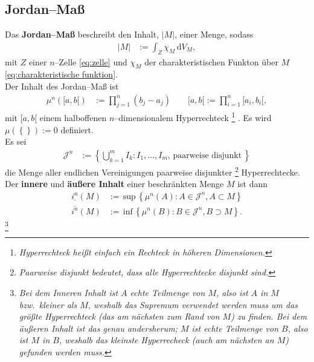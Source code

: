 \documentclass[a4paper,12pt]{article}
\newcommand{\td}{\,\text{d}}
\numberwithin{equation}{section}
\begin{document}
\subsection{Jordan--Maß}
Das \textbf{Jordan--Maß} beschreibt den Inhalt, $|M|$, einer Menge, sodass
\begin{align} 
        |M|&:=\int_{Z}^{}\chi _M\td V_M \label{eq:jordan--maß}
,\end{align} 
mit $Z$ einer $n$--Zelle \eqref{eq:zelle} und $\chi _M$ der charakteristischen Funkton über $M$ \eqref{eq:charakteristische funktion}.\\\indent
Der Inhalt des Jordan--Maß ist
\begin{align} 
        \mu ^n\left([a,b[\right)&:=\prod_{j=1}^{n}\left(b_j-a_j\right)\label{eq:inhalt jordan--maß}\qquad [a,b[:=\prod_{i=1}^{n}[a_i,b_i[
,\end{align} 
mit $[a,b[$ einem halboffenen $n$--dimensionalem Hyperrechteck
\footnote{\textit{Hyperrechteck heißt einfach ein Rechteck in höheren Dimensionen.}}
. Es wird $\mu \left(\left\{\right\}\right):=0$ definiert.\\\indent
Es sei
\begin{align} 
        \mathcal{J}^n&:=\left\{\bigcup _{k=1}^mI_k:I_1,\hdots ,I_m,\,\text{paarweise disjunkt}\,\right\}\label{eq:menge paarweiser disjunkter hyperrechtecke}
\end{align} 
die Menge aller endlichen Vereinigungen paarweise disjunkter
\footnote{\textit{Paarweise disjunkt bedeutet, dass alle Hyperrechtecke disjunkt sind.}}
Hyperrechtecke.\\\indent
Der \textbf{innere} und \textbf{äußere Inhalt} einer beschränkten Menge $M$ ist dann
\begin{align} 
        \underline{i^n}\left(M\right)&:=\,\text{sup}\,\left\{\mu ^n\left(A\right):A \in \mathcal{J}^n,A\subset M\right\}\label{eq:innerer inhalt}\\
        \overline{i^n}\left(M\right)&:=\,\text{inf}\,\left\{\mu ^n\left(B\right):B \in \mathcal{J}^n,B\supset M\right\}\label{eq:äußerer inhalt}
.\end{align}
\footnote{\textit{Bei dem Inneren Inhalt ist $A$ echte Teilmenge von $M$, also ist $A$ \glqq in $M$\grqq{} bzw.\ \glqq kleiner\grqq{} als $M$, weshalb das Supremum verwendet werden muss um das größte Hyperrechteck (das am nächsten zum Rand von $M$) zu finden. Bei dem äußeren Inhalt ist das genau andersherum; $M$ ist echte Teilmenge von $B$, also ist $M$ in $B$, weshalb das kleinste Hyperrecheck (auch am nächsten an $M$) gefunden werden muss.}}
\end{document}
